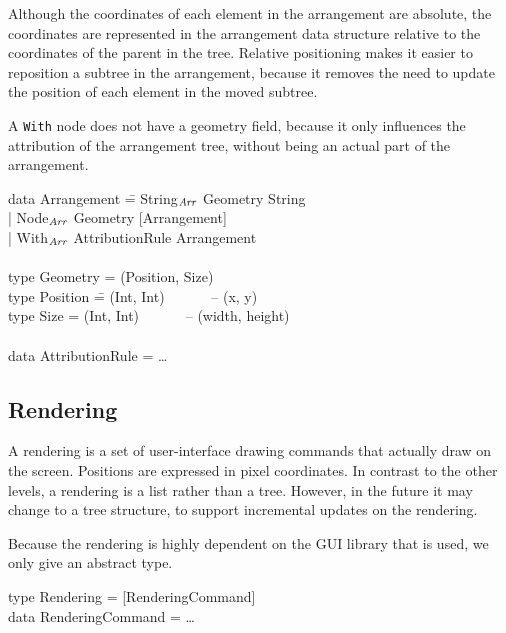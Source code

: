 \documentclass{speauth}
\begin{document}
Although the coordinates of each element in the arrangement are absolute, the coordinates are represented in the arrangement data structure relative to the coordinates of the parent in the tree. Relative positioning makes it easier to reposition a subtree in the arrangement, because it removes the need to update the position of each element in the moved subtree. 

A \verb|With| node does not have a geometry field, because it only influences the attribution of the arrangement tree, without being an actual part of the arrangement. 


\ttfamily
\begin{tabbing}
data Arrangement \= =  String$_{\mathit{Arr}}$ Geometry String\\
                 \> | Node$_{\mathit{Arr}}$ Geometry [Arrangement]\\
                 \> | With$_{\mathit{Arr}}$ AttributionRule Arrangement\\
\\
type Geometry = (Position, Size)\\
type Position \= = (Int, Int)  ~~~~~~-- (x,  y)\\
type Size      \> = (Int, Int)  ~~~~~~-- (width, height)\\
\\
data AttributionRule = \dots\\
\end{tabbing}
\rmfamily

%																
\subsection{Rendering}

A rendering is a set of user-interface drawing commands that actually draw on the screen. Positions are expressed in pixel coordinates. In contrast to the other levels, a rendering is a list rather than a tree. However, in the future it may change to a tree structure, to support incremental updates on the rendering. 

Because the rendering is highly dependent on the GUI library that is used, we only give an abstract type.

\noindent
\ttfamily
\begin{tabbing}
type Rendering = [RenderingCommand]\\
data RenderingCommand = \dots
\end{tabbing}
\rmfamily
\end{document}
